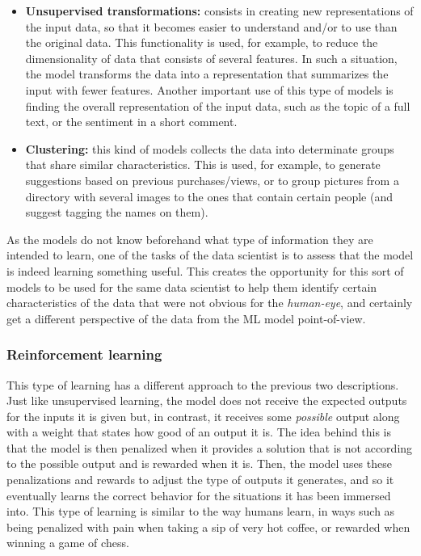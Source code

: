 \begin{itemize}
    \item \textbf{Unsupervised transformations:} consists in creating new representations of the input data, so that it becomes easier to understand and/or to use than the original data. This functionality is used, for example, to reduce the dimensionality of data that consists of several features. In such a situation, the model transforms the data into a representation that summarizes the input with fewer features. Another important use of this type of models is finding the overall representation of the input data, such as the topic of a full text, or the sentiment in a short comment.
    \item \textbf{Clustering:} this kind of models collects the data into determinate groups that share similar characteristics. This is used, for example, to generate suggestions based on previous purchases/views, or to group pictures from a directory with several images to the ones that contain certain people (and suggest tagging the names on them).
\end{itemize}

As the models do not know beforehand what type of information they are intended to learn, one of the tasks of the data scientist is to assess that the model is indeed learning something useful. This creates the opportunity for this sort of models to be used for the same data scientist to help them identify certain characteristics of the data that were not obvious for the \emph{human-eye}, and certainly get a different perspective of the data from the \ac{ML} model point-of-view.

\subsubsection{Reinforcement learning}
This type of learning has a different approach to the previous two descriptions. Just like unsupervised learning, the model does not receive the expected outputs for the inputs it is given but, in contrast, it receives some \emph{possible} output along with a weight that states how good of an output it is. The idea behind this is that the model is then penalized when it provides a solution that is not according to the possible output and is rewarded when it is. Then, the model uses these penalizations and rewards to adjust the type of outputs it generates, and so it eventually learns the correct behavior for the situations it has been immersed into. This type of learning is similar to the way humans learn, in ways such as being penalized with pain when taking a sip of very hot coffee, or rewarded when winning a game of chess.\\

